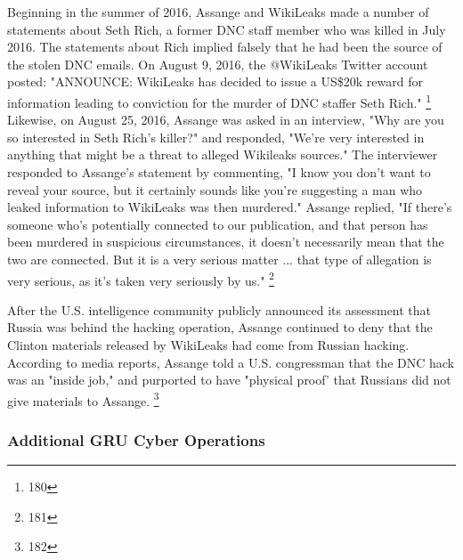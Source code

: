 Beginning in the summer of 2016, Assange and WikiLeaks made a number of statements about Seth Rich, a former DNC staff member who was killed in July 2016.
The statements about Rich implied falsely that he had been the source of the stolen DNC emails.
On August 9, 2016, the @WikiLeaks Twitter account posted: "ANNOUNCE: WikiLeaks has decided to issue a US\$20k reward for information leading to conviction for the murder of DNC staffer Seth Rich."%
\footnote{180}
Likewise, on August 25, 2016, Assange was asked in an interview, "Why are you so interested in Seth Rich's killer?" and responded, "We're very interested in anything that might be a threat to alleged Wikileaks sources."
The interviewer responded to Assange's statement by commenting, "I know you don't want to reveal your source, but it certainly sounds like you're suggesting a man who leaked information to WikiLeaks was then murdered."
Assange replied, "If there's someone who's potentially connected to our publication, and that person has been murdered in suspicious circumstances, it doesn't necessarily mean that the two are connected.
But it is a very serious matter ... that type of allegation is very serious, as it's taken very seriously by us."%
\footnote{181}

After the U.S. intelligence community publicly announced its assessment that Russia was behind the hacking operation, Assange continued to deny that the Clinton materials released by WikiLeaks had come from Russian hacking.
According to media reports, Assange told a U.S. congressman that the DNC hack was an "inside job," and purported to have "physical proof' that Russians did not give materials to Assange.%
\footnote{182}

\subsubsection{Additional GRU Cyber Operations}
